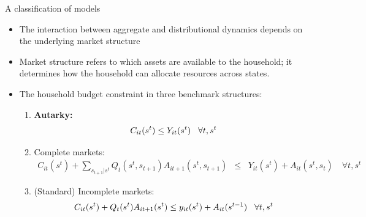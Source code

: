 \documentclass[9pt]{beamer}
\newcommand{\bit}{\begin{itemize}}
\newcommand{\eit}{\end{itemize}}
\newcommand{\ben}{\begin{enumerate}}
\newcommand{\een}{\end{enumerate}}
\newcommand{\bc}{\color{blue}}
\begin{document}
\begin{frame}{A classification of models}
\setlength{\arraycolsep}{1pt}

\bit
\setlength\itemsep{1em}

\item The interaction between aggregate and distributional dynamics depends on the underlying {\bc market structure}

\item {\bc Market structure} refers to which assets are available to the household; it determines how the household can allocate resources across states.

\item The household budget constraint in three benchmark structures:
\ben
\item \bf Autarky:
\begin{eqnarray}
C_{it}(s^t) \leq Y_{it}(s^t) \hspace{3mm} \forall t,s^t \nonumber 
\end{eqnarray}

\item Complete markets:
\begin{eqnarray}
C_{it}(s^t) + \sum_{s_{t+1}|s^t} Q_t(s^t, s_{t+1}) A_{it+1}(s^t, s_{t+1})
&\leq& Y_{it}(s^t) + A_{it}(s^t, s_t) \quad \forall t, s^{t}  \nonumber 
\end{eqnarray}

\item (Standard) Incomplete markets: \normalfont
\begin{eqnarray}
C_{it}(s^t) + Q_t(s^t) A_{it+1}(s^t)\leq y_{it}(s^t) + A_{it}(s^{t-1}) \hspace{3mm} \forall t,s^t \nonumber 
\end{eqnarray}
\een

\eit

\end{frame}
\end{document}
